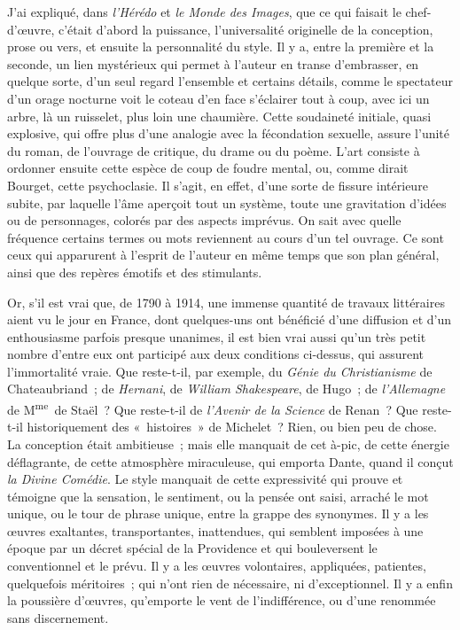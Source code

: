 \documentclass[french,twoside]{book} %
\begin{document}
J’ai expliqué, dans {\itshape l’Hérédo} et {\itshape le Monde des Images}, que ce qui faisait le chef-d’œuvre, c’était d’abord la puissance, l’universalité originelle de la conception, prose ou vers, et ensuite la personnalité du style. Il y a, entre la première et la seconde, un lien mystérieux qui permet à l’auteur en transe d’embrasser, en quelque sorte, d’un seul regard l’ensemble et certains détails, comme le spectateur d’un orage nocturne voit le coteau d’en face s’éclairer tout à coup, avec ici un arbre, là un ruisselet, plus loin une chaumière. Cette soudaineté initiale, quasi explosive, qui offre plus d’une analogie avec la fécondation sexuelle, assure l’unité du roman, de l’ouvrage de critique, du drame ou du poème. L’art consiste à ordonner ensuite cette espèce de coup de foudre mental, ou, comme dirait Bourget, cette psychoclasie. Il s’agit, en effet, d’une sorte de fissure intérieure subite, par laquelle l’âme aperçoit tout un système, toute une gravitation d’idées ou de personnages, colorés par des aspects imprévus. On sait avec quelle fréquence certains termes ou mots reviennent au cours d’un tel ouvrage. Ce sont ceux qui apparurent à l’esprit de l’auteur en même temps que son plan général, ainsi que des repères émotifs et des stimulants.\par
Or, s’il est vrai que, de 1790 à 1914, une immense quantité de travaux littéraires aient vu le jour en France, dont quelques-uns ont bénéficié d’une diffusion et d’un enthousiasme parfois presque unanimes, il est bien vrai aussi qu’un très petit nombre d’entre eux ont participé aux deux conditions ci-dessus, qui assurent l’immortalité vraie. Que reste-t-il, par exemple, du {\itshape Génie du Christianisme} de Chateaubriand ; de {\itshape Hernani}, de {\itshape William Shakespeare}, de Hugo ; de {\itshape l’Allemagne} de M\textsuperscript{me} de Staël ? Que reste-t-il de {\itshape l’Avenir de la Science} de Renan ? Que reste-t-il historiquement des « histoires » de Michelet ? Rien, ou bien peu de chose. La conception était ambitieuse ; mais elle manquait de cet à-pic, de cette énergie déflagrante, de cette atmosphère miraculeuse, qui emporta Dante, quand il conçut {\itshape la Divine Comédie}. Le style manquait de cette expressivité qui prouve et témoigne que la sensation, le sentiment, ou la pensée ont saisi, arraché le mot unique, ou le tour de phrase unique, entre la grappe des synonymes. Il y a les œuvres exaltantes, transportantes, inattendues, qui semblent imposées à une époque par un décret spécial de la Providence et qui bouleversent le conventionnel et le prévu. Il y a les œuvres volontaires, appliquées, patientes, quelquefois méritoires ; qui n’ont rien de nécessaire, ni d’exceptionnel. Il y a enfin la poussière d’œuvres, qu’emporte le vent de l’indifférence, ou d’une renommée sans discernement.\par
\end{document}
